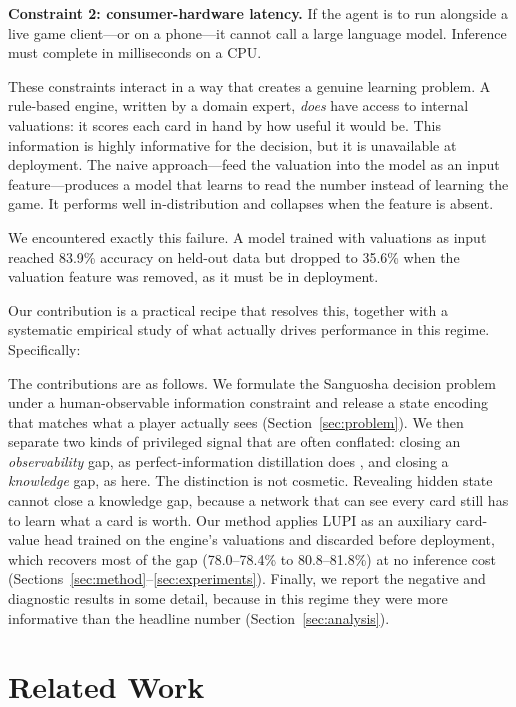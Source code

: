 \documentclass[11pt]{article}
\begin{document}
\textbf{Constraint 2: consumer-hardware latency.} If the agent is to run alongside a live game client---or on a phone---it cannot call a large language model. Inference must complete in milliseconds on a CPU.

These constraints interact in a way that creates a genuine learning problem. A rule-based engine, written by a domain expert, \emph{does} have access to internal valuations: it scores each card in hand by how useful it would be. This information is highly informative for the decision, but it is unavailable at deployment. The naive approach---feed the valuation into the model as an input feature---produces a model that learns to read the number instead of learning the game. It performs well in-distribution and collapses when the feature is absent.

We encountered exactly this failure. A model trained with valuations as input reached 83.9\% accuracy on held-out data but dropped to 35.6\% when the valuation feature was removed, as it must be in deployment.

Our contribution is a practical recipe that resolves this, together with a systematic empirical study of what actually drives performance in this regime. Specifically:

The contributions are as follows. We formulate the Sanguosha decision problem under a human-observable information constraint and release a state encoding that matches what a player actually sees (Section~\ref{sec:problem}). We then separate two kinds of privileged signal that are often conflated: closing an \emph{observability} gap, as perfect-information distillation does \cite{yang2022perfectdou}, and closing a \emph{knowledge} gap, as here. The distinction is not cosmetic. Revealing hidden state cannot close a knowledge gap, because a network that can see every card still has to learn what a card is worth. Our method applies LUPI \cite{vapnik2009,vapnik2015} as an auxiliary card-value head trained on the engine's valuations and discarded before deployment, which recovers most of the gap (78.0--78.4\% to 80.8--81.8\%) at no inference cost (Sections~\ref{sec:method}--\ref{sec:experiments}). Finally, we report the negative and diagnostic results in some detail, because in this regime they were more informative than the headline number (Section~\ref{sec:analysis}).

\section{Related Work}
\end{document}
